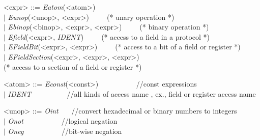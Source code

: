 \documentclass{article}
\begin{document}
\begin{grammar}
{\par}


{\renewcommand\baselinestretch{0}\selectfont

<expr>     ::=   \textit{Eatom}(<atom>)  \\
     \hspace*{0.6cm} $\mid$  \textit{Eunop}(<unop>, <expr>)~~~~~(* unary operation *)\\
     \hspace*{0.6cm} $\mid$  \textit{Ebinop}(<binop>, <expr>, <expr>)~~~~~(* binary operation *) \\
     \hspace*{0.6cm} $\mid$  \textit{Efield}(<expr>, \emph{IDENT})~~~~~(* access to a field in a protocol *) \\
     \hspace*{0.6cm} $\mid$  \textit{EFieldBit}(<expr>, <expr>)~~~~~(* access to a bit of a field or register  *) \\
     \hspace*{0.6cm} $\mid$  \textit{EFieldSection}(<expr>, <expr>, <expr>)   \\
     \hspace*{3cm} (* access to a section of a field or register  *)

<atom>     ::=   \textit{Econst}(<const>) ~~~~~~~~~~//const expressions  \\
     \hspace*{0.6cm} $\mid$  \emph{IDENT}~~~~~~~~~~//all kinds of access name , ex., field or register access name 

<unop>     ::=   \textit{Oint} ~~~//convert hexadecimal or binary numbers to integers \\
     \hspace*{0.6cm} $\mid$  \textit{Onot} ~~~~~~~~~~//logical negation \\
     \hspace*{0.6cm} $\mid$  \textit{Oneg} ~~~~~~~~~~//bit-wise negation

}
\end{grammar}
\end{document}
